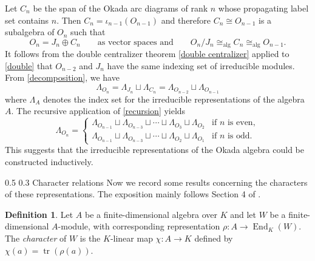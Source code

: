 \documentclass[12pt,reqno]{amsart}
\makeatletter
\renewcommand{\subsection}{\@startsection{subsection}{2}{0pt}%
  {0.5\baselineskip}%
  {0.3\baselineskip}%
  {\normalfont\bfseries}}
\numberwithin{equation}{section}
\theoremstyle{definition}
\newtheorem{definition}[theorem]{Definition}
\theoremstyle{definition}
\makeatother
\begin{document}
Let $C_n$ be the span of the Okada arc diagrams of rank $n$ whose propagating label set contains $n$. Then $C_n= \iota_{n-1}(O_{n-1})$ and  therefore $C_n \cong O_{n-1}$ is a subalgebra of $O_n$ such that 
\begin{equation}\label{decomposition}
O_n=J_n\oplus C_n \qquad \text{as vector spaces and}
\qquad
O_n/J_n\cong_{\mathrm{alg}}C_n
\cong_{\mathrm{alg}}O_{n-1}.
\end{equation}
It follows from the double centralizer theorem \ref{double centralizer} applied to \eqref{double} that $O_{n-2}$ and $J_n$ have the same indexing set of irreducible modules. From \eqref{decomposition}, we have 
\begin{equation}\label{recursion}
\Lambda_{O_n}= \Lambda_{J_n} \sqcup \Lambda_{C_n}= \Lambda_{O_{n-2}}\sqcup \Lambda_{O_{n-1}} 
    \end{equation}
where $\Lambda_A$ denotes the index set for the irreducible representations of the algebra $A$. The recursive application of \eqref{recursion} yields  
\begin{equation}
    \Lambda_{O_n}=\begin{cases}
     \Lambda_{O_{n-1}} \sqcup \Lambda_{O_{n-3}}\sqcup\cdots \sqcup \Lambda_{O_3}\sqcup  \Lambda_{O_2}& \text{if $n$ is even},\\
      \Lambda_{O_{n-1}} \sqcup \Lambda_{O_{n-3}}\sqcup \cdots \sqcup \Lambda_{O_2} \sqcup \Lambda_{O_1} & \text{if $n$ is odd}.
    \end{cases} 
\end{equation}
This suggests that the irreducible representations of the Okada algebra could be constructed inductively.

\subsection{Character relations}
Now we record some results concerning the characters of these representations. The exposition mainly follows Section 4 of \cite{HalversonReeks}. 
\begin{definition}
    Let $A$ be a finite-dimensional algebra over $K$ and let $W$ be a finite-dimensional $A$-module, with corresponding representation $\rho: A \to \operatorname{End}_K(W)$. The \emph{character} of $W$ is the $K$-linear map $\chi: A \to K$ defined by $\chi(a)= \operatorname{tr}(\rho(a)).$
\end{definition}
\end{document}
